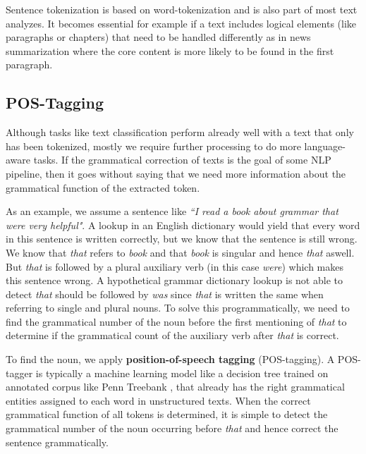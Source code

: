 Sentence tokenization is based on word-tokenization and is also part of most text analyzes. It becomes essential for example if a text includes logical elements (like paragraphs or chapters) that need to be handled differently as in news summarization where the core content is more likely to be found in the first paragraph.


\subsection{POS-Tagging}
Although tasks like text classification perform already well with a text that only has been tokenized, mostly we require further processing to do more language-aware tasks.
If the grammatical correction of texts is the goal of some NLP pipeline, then it goes without saying that we need more information about the grammatical function of the extracted token.

As an example, we assume a sentence like \textit{``I read a book about grammar that were very helpful"}.
A lookup in an English dictionary would yield that every word in this sentence is written correctly, but we know that the sentence is still wrong.
We know that \textit{that} refers to \textit{book} and that \textit{book} is singular and hence \textit{that} aswell. But \textit{that} is followed by a plural auxiliary verb (in this case \textit{were}) which makes this sentence wrong.
A hypothetical grammar dictionary lookup is not able to detect \textit{that} should be followed by \textit{was} since \textit{that} is written the same when referring to single and plural nouns.
To solve this programmatically, we need to find the grammatical number of the noun before the first mentioning of \textit{that} to determine if the grammatical count of the auxiliary verb after \textit{that} is correct.

To find the noun, we apply \textbf{position-of-speech tagging} (\gls{POS-tagging}). A POS-tagger is typically a machine learning model like a decision tree \citep{Marquez98} trained on annotated corpus like Penn Treebank \citep{PennTreebank}, that already has the right grammatical entities assigned to each word in unstructured texts.
When the correct grammatical function of all tokens is determined, it is simple to detect the grammatical number of the noun occurring before \textit{that} and hence correct the sentence grammatically.

